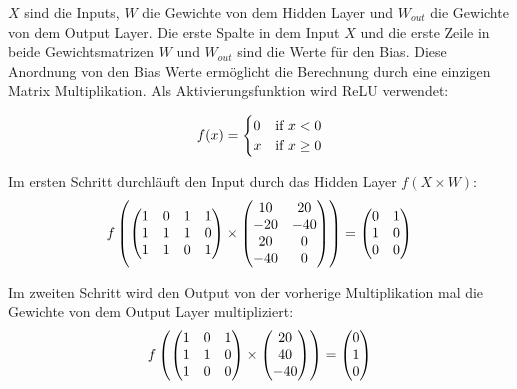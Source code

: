 $ X $ sind die Inputs, $ W $ die Gewichte von dem Hidden Layer und $ W_{out} $ die Gewichte von dem Output Layer.
Die erste Spalte in dem Input $ X $ und die erste Zeile in beide Gewichtsmatrizen $ W $ und $ W_{out} $ sind die Werte für den Bias.
Diese Anordnung von den Bias Werte ermöglicht die Berechnung durch eine einzigen Matrix Multiplikation. Als Aktivierungsfunktion wird ReLU 
\cite{10.5555/3104322.3104425} verwendet:

\begin{equation}
  \vspace{5pt}
  f(x) = 
  \begin{cases}
    0 &\text{if \(x < 0\)}  \\
    x &\text{if \(x \geq 0\)} 
  \end{cases}
\end{equation}

Im ersten Schritt durchläuft den Input durch das Hidden Layer $ f(X \times W) $:
\begin{equation}
  \vspace{5pt}
  f \left(
  \begin{pmatrix}
    1 &0 &1 &1 \\
    1 &1 &1 &0 \\
    1 &1 &0 &1
  \end{pmatrix}
  \times
  \begin{pmatrix}
    10 &20 \\
    -20 &-40 \\
    20 &0 \\
    -40 &0
  \end{pmatrix}
  \right)
  =
  \begin{pmatrix}
    0 &1 \\
    1 &0 \\
    0 &0
  \end{pmatrix}
\end{equation}

Im zweiten Schritt wird den Output von der vorherige Multiplikation mal die Gewichte von dem Output Layer multipliziert:
\begin{equation}
  \vspace{5pt}
  f \left(
  \begin{pmatrix}
    1 &0 &1 \\
    1 &1 &0 \\
    1 &0 &0
  \end{pmatrix}
  \times
  \begin{pmatrix}
    20 \\
    40 \\
    -40
  \end{pmatrix}
  \right)
  =
  \begin{pmatrix}
    0 \\
    1 \\
    0
  \end{pmatrix}
\end{equation}

